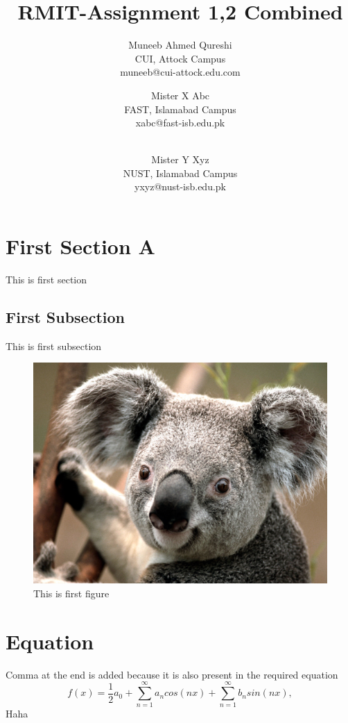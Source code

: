 \documentclass[titlepage]{article}
\begin{document}
\title{RMIT-Assignment 1,2 Combined}
\author
{
	Muneeb Ahmed Qureshi\\
	CUI, Attock Campus\\
	muneeb@cui-attock.edu.com 
	\and 
	Mister X Abc\\
	FAST, Islamabad Campus\\
	xabc@fast-isb.edu.pk
	\and
	\\Mister Y Xyz\\
	NUST, Islamabad Campus \\
	yxyz@nust-isb.edu.pk
}
\maketitle
\section{First Section A}
This is first section
\subsection{First Subsection}
This is first subsection
\begin{figure}[h]
	\includegraphics[width=\linewidth]{koala}
	\caption{This is first figure}
\end{figure}
\section{Equation}
Comma at the end is added because it is also present in the required equation
$$f(x) = \frac{1}{2}a_{0} + \sum_{n=1}^{\infty}a_n cos(nx) + \sum_{n=1}^{\infty} b_n sin(nx),$$
\tablename{Haha}
\end{document}
